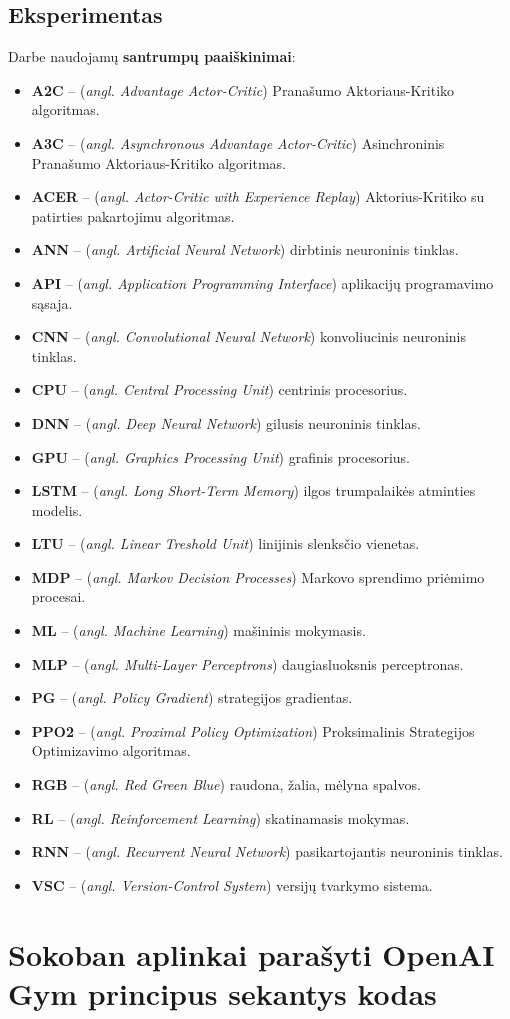 \documentclass{VUMIFPSbakalaurinis}
\begin{document}
\subsection{Eksperimentas}

\printbibliography[heading=bibintoc] 

{
	Darbe naudojamų \textbf{santrumpų paaiškinimai}:
	\begin{itemize}
		\item \textbf{A2C} -- (\textit{angl. Advantage Actor-Critic}) Pranašumo Aktoriaus-Kritiko algoritmas.
		\item \textbf{A3C} -- (\textit{angl. Asynchronous Advantage Actor-Critic}) Asinchroninis Pranašumo Aktoriaus-Kritiko algoritmas.
		\item \textbf{ACER} -- (\textit{angl. Actor-Critic with Experience Replay}) Aktorius-Kritiko su patirties pakartojimu algoritmas.
		\item \textbf{ANN} -- (\textit{angl. Artificial Neural Network}) dirbtinis neuroninis tinklas.
		\item \textbf{API} -- (\textit{angl. Application Programming Interface}) aplikacijų programavimo sąsaja.
		\item \textbf{CNN} -- (\textit{angl. Convolutional Neural Network}) konvoliucinis neuroninis tinklas.
		\item \textbf{CPU} -- (\textit{angl. Central Processing Unit}) centrinis procesorius.
		\item \textbf{DNN} -- (\textit{angl. Deep Neural Network}) gilusis neuroninis tinklas.
		\item \textbf{GPU} -- (\textit{angl. Graphics Processing Unit}) grafinis procesorius.
		\item \textbf{LSTM} -- (\textit{angl. Long Short-Term Memory}) ilgos trumpalaikės atminties modelis.
		\item \textbf{LTU} -- (\textit{angl. Linear Treshold Unit}) linijinis slenksčio vienetas.
		\item \textbf{MDP} -- (\textit{angl. Markov Decision Processes}) Markovo sprendimo priėmimo procesai.
		\item \textbf{ML} -- (\textit{angl. Machine Learning}) mašininis mokymasis.
		\item \textbf{MLP} -- (\textit{angl. Multi-Layer Perceptrons}) daugiasluoksnis perceptronas.
		\item \textbf{PG} -- (\textit{angl. Policy Gradient}) strategijos gradientas.
		\item \textbf{PPO2} -- (\textit{angl. Proximal Policy Optimization}) Proksimalinis Strategijos Optimizavimo algoritmas.
		\item \textbf{RGB} -- (\textit{angl. Red Green Blue}) raudona, žalia, mėlyna spalvos.
		\item \textbf{RL} -- (\textit{angl. Reinforcement Learning}) skatinamasis mokymas.
		\item \textbf{RNN} -- (\textit{angl. Recurrent Neural Network}) pasikartojantis neuroninis tinklas.
		\item \textbf{VSC} -- (\textit{angl. Version-Control System}) versijų tvarkymo sistema.
	\end{itemize}
}


\section{Sokoban aplinkai parašyti OpenAI Gym principus sekantys kodas}

\end{document}
